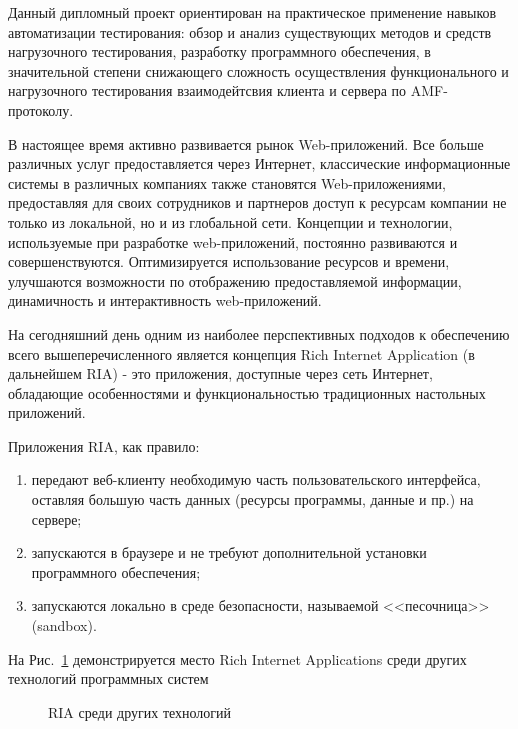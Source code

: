 \Introduction %

Данный дипломный проект ориентирован на практическое применение навыков автоматизации тестирования:
обзор и анализ существующих методов и средств нагрузочного тестирования, разработку программного обеспечения,
в значительной степени снижающего сложность осуществления функционального и нагрузочного тестирования
взаимодейтсвия клиента и сервера по AMF-протоколу.

В настоящее время активно развивается рынок Web-приложений. Все больше различных услуг 
предоставляется через Интернет, классические информационные системы в различных компаниях
также становятся Web-приложениями, предоставляя для своих сотрудников и партнеров
доступ к ресурсам компании не только из локальной, но и из глобальной сети. Концепции
и технологии, используемые при разработке web-приложений, постоянно развиваются и
совершенствуются. Оптимизируется использование ресурсов и времени, улучшаются
возможности по отображению предоставляемой информации, динамичность и интерактивность
web-приложений\cite{overview}.

На сегодняшний день одним из наиболее перспективных подходов к обеспечению всего 
вышеперечисленного является концепция Rich Internet Application (в дальнейшем RIA) - 
это приложения, доступные через сеть Интернет, обладающие особенностями и
функциональностью традиционных настольных приложений.
 
Приложения RIA, как правило:

\begin{enumerate}
\item передают веб-клиенту необходимую часть пользовательского  интерфейса,
оставляя большую часть данных (ресурсы программы, данные и пр.) на сервере;
\item запускаются в браузере и не требуют дополнительной установки программного
обеспечения;
\item запускаются локально в среде безопасности, называемой <<песочница>> (sandbox).
\end{enumerate}

На Рис.~\ref{ris:RIAinWorld.png} демонстрируется место Rich Internet Applications 
среди других технологий программных систем
\begin{figure}[ht]
\caption{RIA среди других технологий}
\label{ris:RIAinWorld.png}
\end{figure}


